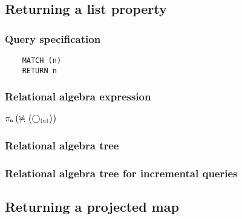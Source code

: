 	\subsection{Returning a list property}

	\subsubsection*{Query specification}

	\begin{lstlisting}
	MATCH (n)
	RETURN n
	\end{lstlisting}


	\subsubsection*{Relational algebra expression}

	$\projection{\var{n}} \left(\alldifferent{} \left(\getvertices{n}{}\right)\right)$

	\subsubsection*{Relational algebra tree}


	\subsubsection*{Relational algebra tree for incremental queries}

	\subsection{Returning a projected map}

